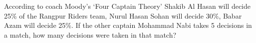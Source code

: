 \documentclass{article}
\begin{document}
\begin{enumerate}[label=\textbf{\arabic*.}]
      According to coach Moody’s ‘Four Captain Theory’ Shakib Al Hasan will decide 25\% of the Rangpur Riders team, Nurul Hasan Sohan will decide 30\%, Babar Azam will decide 25\%. If the other captain Mohammad Nabi takes 5 decisions in a match, how many decisions were taken in that match?

	\end{enumerate}
	
\end{document}
